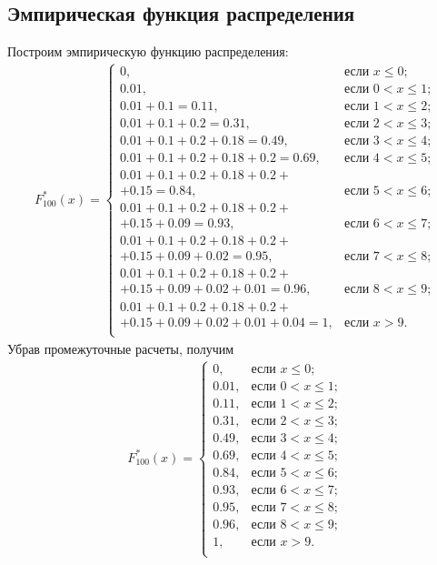 \documentclass[14pt,a4paper]{scrartcl}
\theoremstyle{definition}
\theoremstyle{remark}
\theoremstyle{definition}
\theoremstyle{definition}
\begin{document}
\subsection{Эмпирическая функция распределения}
Построим эмпирическую функцию распределения:
\begin{align*}
  F_{100}^{*}(x) = \begin{cases}
    0,  & \mbox{если } x\leq0; \\
    0.01, & \mbox{если } 0<x\leq1; \\
    0.01+0.1=0.11, & \mbox{если } 1<x\leq2; \\
    0.01+0.1+0.2=0.31, & \mbox{если } 2<x\leq3; \\
    0.01+0.1+0.2+0.18=0.49, & \mbox{если } 3<x\leq4; \\
    0.01+0.1+0.2+0.18+0.2=0.69, & \mbox{если } 4<x\leq5; \\
    0.01+0.1+0.2+0.18+0.2+\\+0.15=0.84, & \mbox{если } 5<x\leq6; \\
    0.01+0.1+0.2+0.18+0.2+\\+0.15+0.09=0.93, & \mbox{если } 6<x\leq7; \\
    0.01+0.1+0.2+0.18+0.2+\\+0.15+0.09+0.02=0.95, & \mbox{если } 7<x\leq8; \\
    0.01+0.1+0.2+0.18+0.2+\\+0.15+0.09+0.02+0.01=0.96, & \mbox{если } 8<x\leq9; \\
    0.01+0.1+0.2+0.18+0.2+\\+0.15+0.09+0.02+0.01+0.04=1, & \mbox{если } x>9. \\
  \end{cases}
\end{align*}
Убрав промежуточные расчеты, получим
\begin{align*}
  F_{100}^{*}(x) = \begin{cases}
    0,  & \mbox{если } x\leq0; \\
    0.01, & \mbox{если } 0<x\leq1; \\
    0.11, & \mbox{если } 1<x\leq2; \\
    0.31, & \mbox{если } 2<x\leq3; \\
    0.49, & \mbox{если } 3<x\leq4; \\
    0.69, & \mbox{если } 4<x\leq5; \\
    0.84, & \mbox{если } 5<x\leq6; \\
    0.93, & \mbox{если } 6<x\leq7; \\
    0.95, & \mbox{если } 7<x\leq8; \\
    0.96, & \mbox{если } 8<x\leq9; \\
    1, & \mbox{если } x>9. \\
  \end{cases}
\end{align*}
\end{document}
